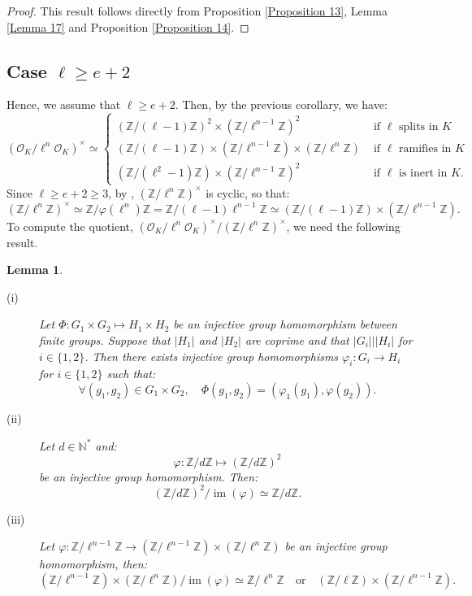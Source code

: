 \documentclass[a4paper,10pt,notitlepage]{report}
\theoremstyle{definition}
\theoremstyle{plain}
\newtheorem{Lemma}[Definition]{Lemma}
\theoremstyle{definition}
\newcommand{\N}{\mathbb{N}}
\newcommand{\Z}{\mathbb{Z}}
\newcommand{\mO}{\mathcal{O}}
\DeclareMathOperator{\im}{im}
\renewcommand{\(}{\left(}
\renewcommand{\)}{\right)}
\begin{document}
\begin{proof}
This result follows directly from Proposition \ref{Proposition 13}, Lemma \ref{Lemma 17} and Proposition \ref{Proposition 14}.
\end{proof}

\subsection{Case $\ell\geq e+2$}

Hence, we assume that $\ell\geq e+2$. Then, by the previous corollary, we have:
\[(\mO_K/\ell^n\mO_K)^\times\simeq \left\{ \begin{array}{ll} 
(\Z/(\ell-1)\Z)^2\times(\Z/\ell^{n-1}\Z)^2 & \mbox{ if $\ell$ splits in $K$}\\
(\Z/(\ell-1)\Z)\times(\Z/\ell^{n-1}\Z)\times(\Z/\ell^{n}\Z)  & \mbox{ if $\ell$ ramifies in $K$}\\ 
(\Z/(\ell^2-1)\Z)\times(\Z/\ell^{n-1}\Z)^2  & \mbox{ if $\ell$ is inert in $K$.}
\end{array}\right.\]
Since $\ell\geq e+2\geq 3$, by \cite[Theorem IV.2]{Ireland1982}, $(\Z/\ell^n\Z)^\times$ is cyclic, so that:
\[(\Z/\ell^n\Z)^\times\simeq \Z/\varphi(\ell^n)\Z=\Z/(\ell-1)\ell^{n-1}\Z\simeq (\Z/(\ell-1)\Z)\times(\Z/\ell^{n-1}\Z).\]
To compute the quotient, $(\mO_K/\ell^n\mO_K)^\times/(\Z/\ell^n\Z)^\times$, we need the following result.

\begin{Lemma}

\begin{description}

\item[(i)] Let $\Phi: G_1\times G_2\longmapsto H_1\times H_2$ be an injective group homomorphism between finite groups. Suppose that $|H_1|$ and $|H_2|$ are coprime and that $|G_i|||H_i|$ for $i\in\{1,2\}$. Then there exists injective group homomorphisms $\varphi_i: G_i\longrightarrow H_i$ for $i\in\{1,2\}$ such that:
\[\forall (g_1, g_2)\in G_1\times G_2, \quad \Phi(g_1,g_2)=(\varphi_1(g_1),\varphi(g_2)).\]

\item[(ii)] Let $d\in\N^*$ and:
\[\varphi: \Z/d\Z\longmapsto (\Z/d\Z)^2\]
be an injective group homomorphism. Then:
\[(\Z/d\Z)^2/\im(\varphi)\simeq \Z/d\Z.\]

\item[(iii)] Let $\varphi: \Z/\ell^{n-1}\Z\longrightarrow (\Z/\ell^{n-1}\Z)\times(\Z/\ell^{n}\Z)$ be an injective group homomorphism, then:
\[(\Z/\ell^{n-1}\Z)\times(\Z/\ell^{n}\Z)/\im(\varphi)\simeq \Z/\ell^{n}\Z \quad \mbox{or} \quad (\Z/\ell\Z)\times(\Z/\ell^{n-1}\Z).\]
\end{description}

\end{Lemma}
\end{document}
